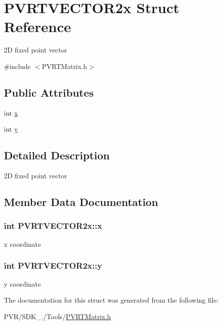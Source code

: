 \hypertarget{struct_p_v_r_t_v_e_c_t_o_r2x}{\section{P\+V\+R\+T\+V\+E\+C\+T\+O\+R2x Struct Reference}
\label{struct_p_v_r_t_v_e_c_t_o_r2x}
}


2\+D fixed point vector  




{\ttfamily \#include $<$P\+V\+R\+T\+Matrix.\+h$>$}

\subsection*{Public Attributes}
\begin{DoxyCompactItemize}
\item 
int \hyperlink{struct_p_v_r_t_v_e_c_t_o_r2x_a83d01f95251076b7a9a714757745ce8f}{x}
\item 
int \hyperlink{struct_p_v_r_t_v_e_c_t_o_r2x_a673b8daafce4c11bad5c9abafd43bc9b}{y}
\end{DoxyCompactItemize}


\subsection{Detailed Description}
2\+D fixed point vector 



 

\subsection{Member Data Documentation}
\hypertarget{struct_p_v_r_t_v_e_c_t_o_r2x_a83d01f95251076b7a9a714757745ce8f}{
\subsubsection[{x}]{\setlength{\rightskip}{0pt plus 5cm}int P\+V\+R\+T\+V\+E\+C\+T\+O\+R2x\+::x}}\label{struct_p_v_r_t_v_e_c_t_o_r2x_a83d01f95251076b7a9a714757745ce8f}
x coordinate \hypertarget{struct_p_v_r_t_v_e_c_t_o_r2x_a673b8daafce4c11bad5c9abafd43bc9b}{
\subsubsection[{y}]{\setlength{\rightskip}{0pt plus 5cm}int P\+V\+R\+T\+V\+E\+C\+T\+O\+R2x\+::y}}\label{struct_p_v_r_t_v_e_c_t_o_r2x_a673b8daafce4c11bad5c9abafd43bc9b}
y coordinate 

The documentation for this struct was generated from the following file\+:\begin{DoxyCompactItemize}
\item 
P\+V\+R/\+S\+D\+K\+\_./\+Tools/\hyperlink{_p_v_r_t_matrix_8h}{P\+V\+R\+T\+Matrix.\+h}\end{DoxyCompactItemize}
